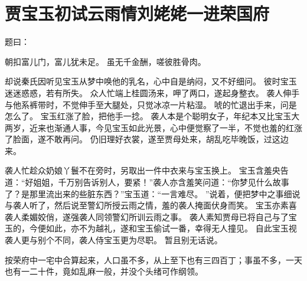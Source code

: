 \chapter{贾宝玉初试云雨情\quad 刘姥姥一进荣国府}
\par
{}\par
题曰：\par
朝扣富儿门，富儿犹未足。
虽无千金酬，嗟彼胜骨肉。
\par
\hop
却说秦氏因听见宝玉从梦中唤他的乳名，心中自是纳闷，又不好细问。
彼时宝玉迷迷惑惑，若有所失。
众人忙端上桂圆汤来，呷了两口，遂起身整衣。
袭人伸手与他系裤带时，不觉伸手至大腿处，只觉冰凉一片粘湿。
唬的忙退出手来，问是怎么了。
宝玉红涨了脸，把他手一捻。
袭人本是个聪明女子，年纪本又比宝玉大两岁，近来也渐通人事，今见宝玉如此光景，心中便觉察了一半，不觉也羞的红涨了脸面，遂不敢再问。
仍旧理好衣裳，遂至贾母处来，胡乱吃毕晚饭，过这边来。
\par
袭人忙趁众奶娘丫鬟不在旁时，另取出一件中衣来与宝玉换上。
宝玉含羞央告道：“好姐姐，千万别告诉别人，要紧！”袭人亦含羞笑问道：“你梦见什么故事了？是那里流出来的些脏东西？”宝玉道：“一言难尽。
”说着，便把梦中之事细说与袭人听了，然后说至警幻所授云雨之情，羞的袭人掩面伏身而笑。
宝玉亦素喜袭人柔媚姣俏，遂强袭人同领警幻所训云雨之事。
袭人素知贾母已将自己与了宝玉的，今便如此，亦不为越礼，遂和宝玉偷试一番，幸得无人撞见。
自此宝玉视袭人更与别个不同，袭人侍宝玉更为尽职。
暂且别无话说。
\par
按荣府中一宅中合算起来，人口虽不多，从上至下也有三四百丁；事虽不多，一天也有一二十件，竟如乱麻一般，并没个头绪可作纲领。
